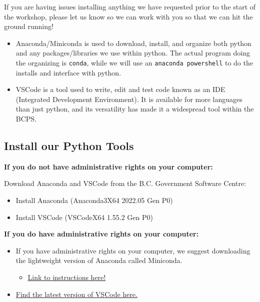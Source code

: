 \documentclass[
  letterpaper,
  DIV=11,
  numbers=noendperiod]{scrreprt}
\providecommand{\tightlist}{%
  \setlength{\itemsep}{0pt}\setlength{\parskip}{0pt}}\usepackage{longtable,booktabs,array}
\begin{document}
\begin{tcolorbox}[enhanced jigsaw, rightrule=.15mm, opacitybacktitle=0.6, colback=white, toprule=.15mm, colframe=quarto-callout-important-color-frame, bottomtitle=1mm, bottomrule=.15mm, arc=.35mm, coltitle=black, breakable, title=\textcolor{quarto-callout-important-color}{\faExclamation}\hspace{0.5em}{Important}, titlerule=0mm, opacityback=0, colbacktitle=quarto-callout-important-color!10!white, left=2mm, toptitle=1mm, leftrule=.75mm]
If you are having issues installing anything we have requested prior to
the start of the workshop, please let us know so we can work with you so
that we can hit the ground running!
\end{tcolorbox}

\begin{itemize}
\tightlist
\item
  Anaconda/Miniconda is used to download, install, and organize both
  python and any packages/libraries we use within python. The actual
  program doing the organizing is \texttt{conda}, while we will use an
  \texttt{anaconda\ powershell} to do the installs and interface with
  python.
\item
  VSCode is a tool used to write, edit and test code known as an IDE
  (Integrated Development Environment). It is available for more
  languages than just python, and its versatility has made it a
  widespread tool within the BCPS.
\end{itemize}

\hypertarget{install-our-python-tools}{%
\subsection{Install our Python Tools}\label{install-our-python-tools}}

\textbf{If you do not have administrative rights on your computer:}

Download Anaconda and VSCode from the B.C. Government Software Centre:

\begin{itemize}
\tightlist
\item
  Install Anaconda (Anaconda3X64 2022.05 Gen P0)
\item
  Install VSCode (VSCodeX64 1.55.2 Gen P0)
\end{itemize}

\textbf{If you do have administrative rights on your computer:}

\begin{itemize}
\tightlist
\item
  If you have administrative rights on your computer, we suggest
  downloading the lightweight version of Anaconda called Miniconda.

  \begin{itemize}
  \tightlist
  \item
    \href{https://docs.conda.io/projects/continuumio-conda/en/latest/user-guide/install/windows.html}{Link
    to instructions here!}
  \end{itemize}
\item
  \href{https://code.visualstudio.com/download}{Find the latest version
  of VSCode here.}
\end{itemize}
\end{document}
